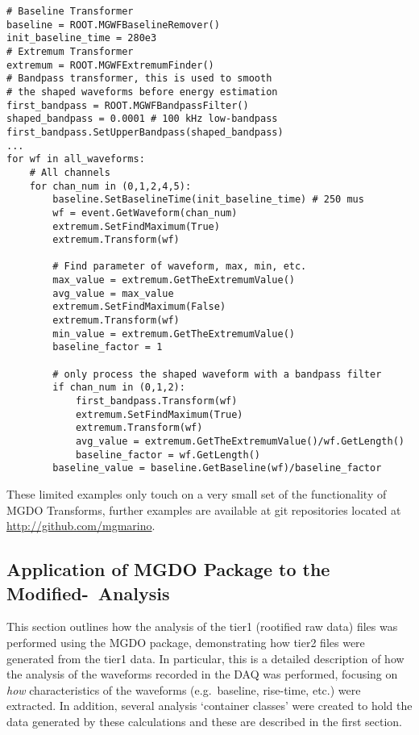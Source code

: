 	\lstset{
	   language=Python}			
			\begin{lstlisting}[caption=Calculating general waveform characteristics in Python]			
# Baseline Transformer
baseline = ROOT.MGWFBaselineRemover()
init_baseline_time = 280e3
# Extremum Transformer
extremum = ROOT.MGWFExtremumFinder()
# Bandpass transformer, this is used to smooth
# the shaped waveforms before energy estimation 
first_bandpass = ROOT.MGWFBandpassFilter()
shaped_bandpass = 0.0001 # 100 kHz low-bandpass
first_bandpass.SetUpperBandpass(shaped_bandpass)
...
for wf in all_waveforms:
    # All channels
    for chan_num in (0,1,2,4,5):
        baseline.SetBaselineTime(init_baseline_time) # 250 mus
        wf = event.GetWaveform(chan_num)
        extremum.SetFindMaximum(True)
        extremum.Transform(wf)

        # Find parameter of waveform, max, min, etc.
        max_value = extremum.GetTheExtremumValue()
        avg_value = max_value
        extremum.SetFindMaximum(False)
        extremum.Transform(wf)
        min_value = extremum.GetTheExtremumValue()
        baseline_factor = 1

        # only process the shaped waveform with a bandpass filter
        if chan_num in (0,1,2):
            first_bandpass.Transform(wf)
            extremum.SetFindMaximum(True)
            extremum.Transform(wf)
            avg_value = extremum.GetTheExtremumValue()/wf.GetLength()
            baseline_factor = wf.GetLength()
        baseline_value = baseline.GetBaseline(wf)/baseline_factor
			\end{lstlisting}	

These limited examples only touch on a very small set of the functionality of MGDO Transforms, further examples are available at git repositories located at \url{http://github.com/mgmarino}.
	
		\subsection{Application of MGDO Package to the Modified-\bege~Analysis}
		
This section outlines how the analysis of the tier1 (rootified raw data) files was performed using the MGDO package, demonstrating how tier2 files were generated from the tier1 data.  In particular, this is a detailed description of how the analysis of the waveforms recorded in the DAQ was performed, focusing on \emph{how} characteristics of the waveforms (e.g.~baseline, rise-time, etc.) were extracted.  In addition, several analysis `container classes' were created to hold the data generated by these calculations and these are described in the first section.  
